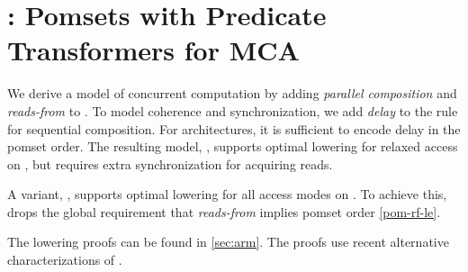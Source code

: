 \section{\PwTmcaTITLE{}: Pomsets with Predicate Transformers for MCA}
\label{sec:mca}

We derive a model of concurrent computation by adding \emph{parallel
  composition} and \emph{reads-from} to .  To model coherence
and synchronization, we add \emph{delay} to the rule for sequential
composition.  For \mca{} architectures, it is sufficient to encode delay in
the pomset order.  The resulting model, , supports optimal lowering
for relaxed access on \armeight{}, but requires extra synchronization for
acquiring reads.

A variant, , supports optimal lowering for all access modes on
\armeight{}.  To achieve this,  drops the global requirement that
\emph{reads-from} implies pomset order \eqref{pom-rf-le}.

The lowering proofs can be found in \textsection\ref{sec:arm}.  The proofs
use recent alternative characterizations of \armeight{} \cite{armed}.

\subsection{}
\label{sec:mca1}

